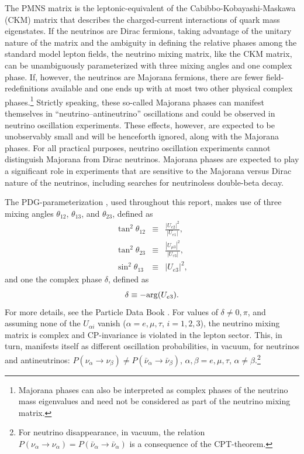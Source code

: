 The PMNS matrix is the leptonic-equivalent of the Cabibbo-Kobayashi-Maskawa (CKM) matrix that describes the charged-current interactions of quark mass eigenstates. If the neutrinos are Dirac fermions, taking advantage of the unitary nature of the matrix and the ambiguity in defining the relative phases among the standard model lepton fields, the neutrino mixing matrix, like the CKM matrix, can be unambiguously parameterized with three mixing angles and one complex phase. If, however, the neutrinos are Majorana fermions, there are fewer field-redefinitions available and one ends up with at most two other physical complex phases.\footnote{Majorana phases can also be interpreted as complex phases of the neutrino mass eigenvalues and need not be considered as part of the neutrino mixing matrix.}  Strictly speaking, these so-called Majorana phases can manifest themselves in ``neutrino--antineutrino'' oscillations \cite{deGouvea:2002gf} and could be observed in neutrino oscillation experiments. These effects, however, are expected to be unobservably small and will be henceforth ignored, along with the Majorana phases. For all practical purposes, neutrino oscillation experiments cannot distinguish Majorana from Dirac neutrinos. Majorana phases are expected to play a significant role in experiments that are sensitive to the Majorana versus Dirac nature of the neutrinos, including searches for neutrinoless double-beta decay. 

The PDG-parameterization \cite{Tanabashi:2018oca}, used throughout this report, makes use of three mixing angles $\theta_{12}$, $\theta_{13}$, and $\theta_{23}$, defined as
\begin{eqnarray}
\tan^2\theta_{12} &\equiv& \frac{|U_{e2}|^2}{|U_{e1}|}, \\
\tan^2\theta_{23} &\equiv& \frac{|U_{\mu3}|^2}{|U_{\tau3}|}, \\
\sin^2\theta_{13} &\equiv& |U_{e3}|^2,
\end{eqnarray} 
and one the complex phase $\delta$, defined as
\begin{equation}
\delta \equiv -{\rm arg}(U_{e3}).
\end{equation}
For more details, see the Particle Data Book \cite{Tanabashi:2018oca}. For values of $\delta\neq 0,\pi$, and assuming none of the $U_{\alpha i}$ vanish ($\alpha=e,\mu,\tau$, $i=1,2,3$), the neutrino mixing matrix is complex and CP-invariance is violated in the lepton sector. This, in turn, manifests itself as different oscillation probabilities, in vacuum, for neutrinos and antineutrinos: $P(\nu_{\alpha}\to\nu_{\beta})\neq P(\bar{\nu}_{\alpha}\to\bar{\nu}_{\beta})$, $\alpha,\beta=e,\mu,\tau$, $\alpha\neq\beta$.\footnote{For neutrino disappearance, in vacuum, the relation $P(\nu_{\alpha}\to\nu_{\alpha}) =P(\bar{\nu}_{\alpha}\to\bar{\nu}_{\alpha})$ is a consequence of the CPT-theorem.} 

